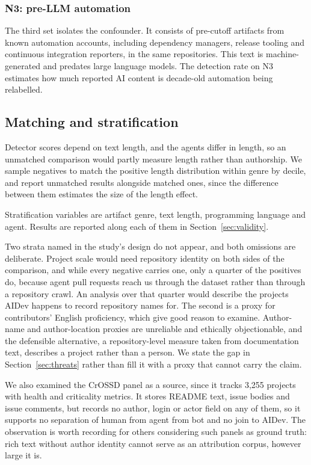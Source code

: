 \subsubsection{N3: pre-LLM automation}
\label{sec:groundtruth:n3}

The third set isolates the confounder. It consists of pre-cutoff artifacts from known
automation accounts, including dependency managers, release tooling and continuous
integration reporters, in the same repositories. This text is machine-generated and
predates large language models. The detection rate on N3 estimates how much reported AI
content is decade-old automation being relabelled.

\subsection{Matching and stratification}
\label{sec:groundtruth:matching}

Detector scores depend on text length, and the agents differ in length, so an unmatched
comparison would partly measure length rather than authorship. We sample negatives to
match the positive length distribution within genre by decile, and report unmatched
results alongside matched ones, since the difference between them estimates the size of
the length effect.

Stratification variables are artifact genre, text length, programming language and
agent. Results are reported along each of them in Section~\ref{sec:validity}.

Two strata named in the study's design do not appear, and both omissions are
deliberate. Project scale would need repository identity on both sides of the
comparison, and while every negative carries one, only a quarter of the positives do,
because agent pull requests reach us through the dataset rather than through a
repository crawl. An analysis over that quarter would describe the projects AIDev
happens to record repository names for. The second is a proxy for contributors' English
proficiency, which \citet{liang2023biased} give good reason to examine. Author-name and
author-location proxies are unreliable and ethically objectionable, and the defensible
alternative, a repository-level measure taken from documentation text, describes a
project rather than a person. We state the gap in Section~\ref{sec:threats} rather than
fill it with a proxy that cannot carry the claim.

We also examined the CrOSSD panel \citep{dam2023crossd} as a source, since it tracks
3{,}255 projects with health and criticality metrics. It stores README text, issue
bodies and issue comments, but records no author, login or actor field on any of them,
so it supports no separation of human from agent from bot and no join to AIDev. The
observation is worth recording for others considering such panels as ground truth: rich
text without author identity cannot serve as an attribution corpus, however large it is.


